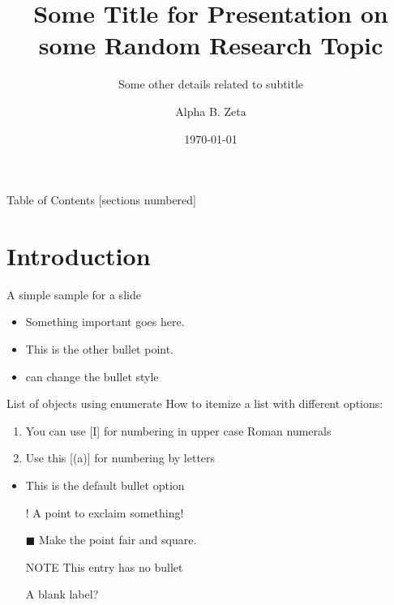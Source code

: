 \documentclass[10pt,xcolor=table]{beamer}
\title[A shorter title]{Some Title for Presentation on some Random Research Topic}
\subtitle[test]{Some other details related to subtitle}
\date{\today}
\author[alphazeta@bu.edu]{Alpha B. Zeta}
\institute[SPTL, BU]{Center for Space Physics, Boston University}
\begin{document}
{
\maketitle
}

%


\begin{frame}[plain]{Table of Contents}
    [sections numbered]
    \tableofcontents[currentsubsection,sectionstyle=show,subsectionstyle=show/shaded]
\end{frame}

\section[Intro]{Introduction}
    \begin{frame}{A simple sample for a slide}
        \begin{itemize}
            \item Something important goes here.
            \item This is the other bullet point.
            \item can change the bullet style
        \end{itemize}
    \end{frame}
    
    \begin{frame}{List of objects using enumerate}
        How to itemize a list with different options:
        \begin{enumerate} %
            \item You can use [I] for numbering in upper case Roman numerals
            \item Use this [(a)] for numbering by letters
        \end{enumerate}
    
        \begin{itemize}
            \item This is the default bullet option
            \item[!] A point to exclaim something!
            \item[$\blacksquare$] Make the point fair and square.
            \item[NOTE] This entry has no bullet
            \item[] A blank label?
        \end{itemize}
    \end{frame}
\end{document}
